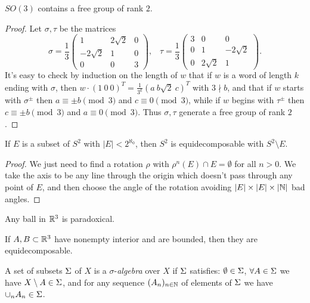 \documentclass[letterpaper,11pt]{report}
\begin{document}
\begin{lem} $SO(3)$ contains a free group of rank $2$.
\end{lem}
\begin{proof} Let $\sigma, \tau$ be the matrices
\[
\sigma = \frac{1}{3}\begin{pmatrix} 1 & 2\sqrt{2} & 0\\ -2\sqrt{2} & 1 & 0\\ 0 & 0 & 3 \end{pmatrix}, \;\;\; \tau = \frac{1}{3}\begin{pmatrix} 3 & 0 & 0\\ 0 & 1 & -2\sqrt{2}\\ 0 & 2\sqrt{2} & 1 \end{pmatrix}.
\]
It's easy to check by induction on the length of $w$ that if $w$ is a word of length $k$ ending with $\sigma$, then $w\cdot (1\ 0\ 0)^T = \frac{1}{3^k} (a\ b\sqrt{2}\ c)^T$ with $3 \nmid b$, and that if $w$ starts with $\sigma^{\pm}$ then $a \equiv \pm b \pmod{3}$ and $c \equiv 0 \pmod{3}$, while if $w$ begins with $\tau^{\pm}$ then $c \equiv \pm b \pmod{3}$ and $a \equiv 0 \pmod{3}$. Thus $\sigma, \tau$ generate a free group of rank $2$.
\end{proof}

\begin{prop} If $E$ is a subset of $S^2$ with $|E| < 2^{\aleph_0}$, then $S^2$ is equidecomposable with $S^2\setminus E$.
\end{prop}
\begin{proof} We just need to find a rotation $\rho$ with $\rho^n(E) \cap E = \emptyset$ for all $n > 0$. We take the axis to be any line through the origin which doesn't pass through any point of $E$, and then choose the angle of the rotation avoiding $|E|\times|E|\times|\mathbb{N}|$ bad angles.
\end{proof}

\begin{cor} Any ball in $\mathbb{R}^3$ is paradoxical.
\end{cor}

\begin{cor} If $A, B \subset \mathbb{R}^3$ have nonempty interior and are bounded, then they are equidecomposable.
\end{cor}


\begin{defn} A set of subsets $\Sigma$ of $X$ is a $\sigma$-\emph{algebra} over $X$ if $\Sigma$ satisfies: $\emptyset \in \Sigma$, $\forall A \in \Sigma$ we have $X\setminus A \in \Sigma$, and for any sequence $(A_n)_{n \in \mathbb{N}}$ of elements of $\Sigma$ we have $\cup_n A_n \in \Sigma$.
\end{defn}
\end{document}
